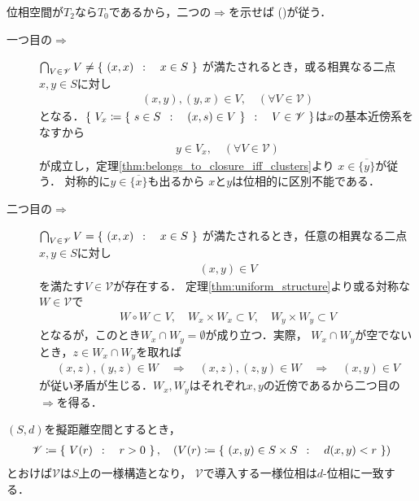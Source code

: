 	\begin{prf} 位相空間が$T_2$なら$T_0$であるから，二つの$\Longrightarrow$を示せば
		()が従う．
		\begin{description}
			\item[一つ目の$\Longrightarrow$]
				$\bigcap_{V \in \mathscr{V}}V \neq \left\{\ (x,x)\ \, : \quad x \in S\ \right\}$
				が満たされるとき，或る相異なる二点$x,y \in S$に対し
				\begin{align}
					(x,y),(y,x) \in V, \quad (\forall V \in \mathscr{V})
				\end{align}
				となる．$\left\{\ V_x \coloneqq \left\{\ s \in S\ \, : \quad (x,s) \in V\ \right\}\ \, : \quad V \in \mathscr{V}\ \right\}$は$x$の基本近傍系をなすから
				\begin{align}
					y \in V_x, \quad (\forall V \in \mathscr{V})
				\end{align}
				が成立し，定理\ref{thm:belongs_to_closure_iff_clusters}より
				$x \in \overline{\{y\}}$が従う．
				対称的に$y \in \overline{\{x\}}$も出るから
				$x$と$y$は位相的に区別不能である．
				
			\item[二つ目の$\Longrightarrow$]
				$\bigcap_{V \in \mathscr{V}}V = \left\{\ (x,x)\ \, : \quad x \in S\ \right\}$
				が満たされるとき，任意の相異なる二点$x,y \in S$に対し
				\begin{align}
					(x,y) \in V
				\end{align}
				を満たす$V \in \mathscr{V}$が存在する．
				定理\ref{thm:uniform_structure}より或る対称な$W \in \mathscr{V}$で
				\begin{align}
					W \circ W \subset V,
					\quad W_x \times W_x \subset V,
					\quad W_y \times W_y \subset V
				\end{align}
				となるが，このとき$W_x \cap W_y = \emptyset$が成り立つ．実際，
				$W_x \cap W_y$が空でないとき，$z \in W_x \cap W_y$を取れば
				\begin{align}
					(x,z),(y,z) \in W \quad \Longrightarrow \quad
					(x,z),(z,y) \in W \quad \Longrightarrow \quad
					(x,y) \in V
				\end{align}
				が従い矛盾が生じる．$W_x,W_y$はそれぞれ$x,y$の近傍であるから二つ目の$\Longrightarrow$を得る．
				\QED
		\end{description}
	\end{prf}
	
	\begin{screen}
		\begin{thm}[擬距離空間の一様構造]
		\label{thm:uniform_structure_on_pseudometric_spaces}
			$(S,d)$を擬距離空間とするとき，
			\begin{align}
				\mathscr{V} \coloneqq
				\left\{\ V(r)\ \, : \quad r > 0\ \right\},
				\quad (V(r) \coloneqq \left\{\ (x,y) \in S \times S\ \, : \quad d(x,y) < r\ \right\})
			\end{align}
			とおけば$\mathscr{V}$は$S$上の一様構造となり，
			$\mathscr{V}$で導入する一様位相は$d$-位相に一致する．
		\end{thm}
	\end{screen}
	
